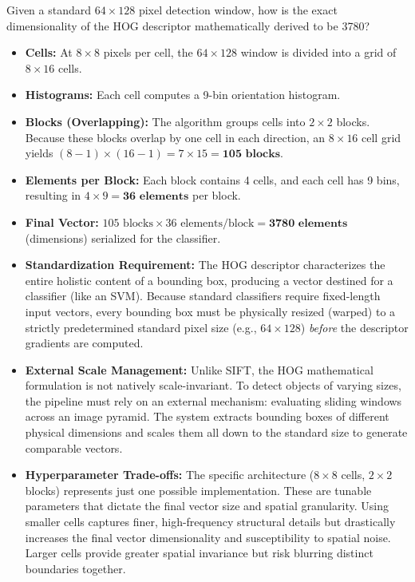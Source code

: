 {Given a standard $64 \times 128$ pixel detection window, how is the exact dimensionality of the HOG descriptor mathematically derived to be 3780?
\begin{itemize}
    \item \textbf{Cells:} At $8 \times 8$ pixels per cell, the $64 \times 128$ window is divided into a grid of $8 \times 16$ cells.
    \item \textbf{Histograms:} Each cell computes a 9-bin orientation histogram.
    \item \textbf{Blocks (Overlapping):} The algorithm groups cells into $2 \times 2$ blocks. Because these blocks overlap by one cell in each direction, an $8 \times 16$ cell grid yields $(8-1) \times (16-1) = 7 \times 15 = \textbf{105 blocks}$.
    \item \textbf{Elements per Block:} Each block contains 4 cells, and each cell has 9 bins, resulting in $4 \times 9 = \textbf{36 elements}$ per block.
    \item \textbf{Final Vector:} $105 \text{ blocks} \times 36 \text{ elements/block} = \textbf{3780 elements}$ (dimensions) serialized for the classifier.
\end{itemize}}

{
\begin{itemize}
    \item \textbf{Standardization Requirement:} The HOG descriptor characterizes the entire holistic content of a bounding box, producing a vector destined for a classifier (like an SVM). Because standard classifiers require fixed-length input vectors, every bounding box must be physically resized (warped) to a strictly predetermined standard pixel size (e.g., $64 \times 128$) \textit{before} the descriptor gradients are computed.
    \item \textbf{External Scale Management:} Unlike SIFT, the HOG mathematical formulation is not natively scale-invariant. To detect objects of varying sizes, the pipeline must rely on an external mechanism: evaluating sliding windows across an image pyramid. The system extracts bounding boxes of different physical dimensions and scales them all down to the standard size to generate comparable vectors.
    \item \textbf{Hyperparameter Trade-offs:} The specific architecture ($8 \times 8$ cells, $2 \times 2$ blocks) represents just one possible implementation. These are tunable parameters that dictate the final vector size and spatial granularity. Using smaller cells captures finer, high-frequency structural details but drastically increases the final vector dimensionality and susceptibility to spatial noise. Larger cells provide greater spatial invariance but risk blurring distinct boundaries together.
\end{itemize}}

